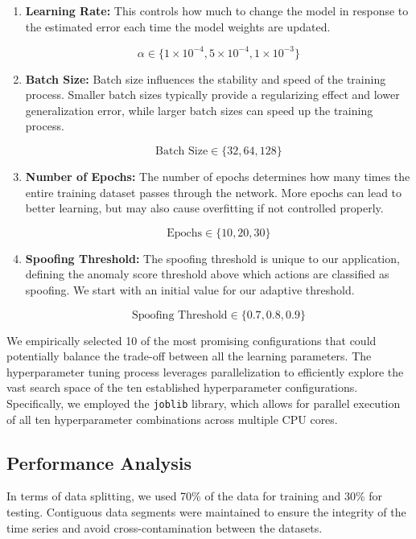 \documentclass[conference]{IEEEtran}
\begin{document}
\begin{enumerate}
\item{\textbf{Learning Rate:} This controls how much to change the model in response to the estimated error each time the model weights are updated.}

\[
\alpha \in \{1 \times 10^{-4}, 5 \times 10^{-4}, 1 \times 10^{-3}\}
\]

\item{\textbf{Batch Size:} Batch size influences the stability and speed of the training process. Smaller batch sizes typically provide a regularizing effect and lower generalization error, while larger batch sizes can speed up the training process.}

\[
\text{Batch Size} \in \{32, 64, 128\}
\]

\item{\textbf{Number of Epochs:} The number of epochs determines how many times the entire training dataset passes through the network. More epochs can lead to better learning, but may also cause overfitting if not controlled properly.}

\[
\text{Epochs} \in \{10, 20, 30\}
\]

\item{\textbf{Spoofing Threshold:} The spoofing threshold is unique to our application, defining the anomaly score threshold above which actions are classified as spoofing. We start with an initial value for our adaptive threshold.}

\[
\text{Spoofing Threshold} \in \{0.7, 0.8, 0.9\}
\]
\end{enumerate}

\par We empirically selected 10 of the most promising configurations that could potentially balance the trade-off between all the learning parameters. The hyperparameter tuning process leverages parallelization to efficiently explore the vast search space of the ten established hyperparameter configurations. Specifically, we employed the \texttt{joblib} library, which allows for parallel execution of all ten hyperparameter combinations across multiple CPU cores.

\subsection{Performance Analysis}

\par In terms of data splitting, we used 70\% of the data for training and 30\% for testing. Contiguous data segments were maintained to ensure the integrity of the time series and avoid cross-contamination between the datasets.
\end{document}
